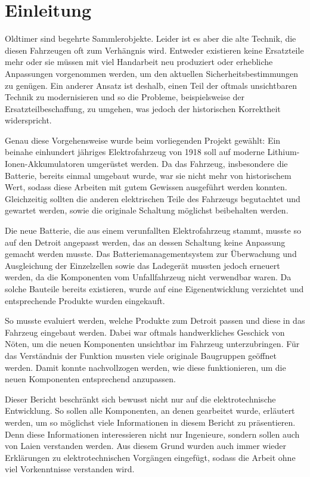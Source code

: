 \chapter{Einleitung}

Oldtimer sind begehrte Sammlerobjekte. Leider ist es aber die alte Technik, die diesen Fahrzeugen oft zum Verhängnis wird. Entweder existieren keine Ersatzteile mehr oder sie müssen mit viel Handarbeit neu produziert oder erhebliche Anpassungen vorgenommen werden, um den aktuellen Sicherheitsbestimmungen zu genügen. Ein anderer Ansatz ist deshalb, einen Teil der oftmals unsichtbaren Technik zu modernisieren und so die Probleme, beispielsweise der Ersatzteilbeschaffung, zu umgehen, was jedoch der historischen Korrektheit widerspricht.

Genau diese Vorgehensweise wurde beim vorliegenden Projekt gewählt: Ein beinahe einhundert jähriges Elektrofahrzeug von 1918 soll auf moderne Lithium-Ionen-Akkumulatoren umgerüstet werden. Da das Fahrzeug, insbesondere die Batterie, bereits einmal umgebaut wurde, war sie nicht mehr von historischem Wert, sodass diese Arbeiten mit gutem Gewissen ausgeführt werden konnten. Gleichzeitig sollten die anderen elektrischen Teile des Fahrzeugs begutachtet und gewartet werden, sowie die originale Schaltung möglichst beibehalten werden.

Die neue Batterie, die aus einem verunfallten Elektrofahrzeug stammt, musste so auf den Detroit angepasst werden, das an dessen Schaltung keine Anpassung gemacht werden musste. Das Batteriemanagementsystem zur Überwachung und Ausgleichung der Einzelzellen sowie das Ladegerät mussten jedoch erneuert werden, da die Komponenten vom Unfallfahrzeug nicht verwendbar waren. Da solche Bauteile bereits existieren, wurde auf eine Eigenentwicklung verzichtet und entsprechende Produkte wurden eingekauft.

So musste evaluiert werden, welche Produkte zum Detroit passen und diese in das Fahrzeug eingebaut werden. Dabei war oftmals handwerkliches Geschick von Nöten, um die neuen Komponenten unsichtbar im Fahrzeug unterzubringen. Für das Verständnis der Funktion mussten viele originale Baugruppen geöffnet werden. Damit konnte nachvollzogen werden, wie diese funktionieren, um die neuen Komponenten entsprechend anzupassen.

Dieser Bericht beschränkt sich bewusst nicht nur auf die elektrotechnische Entwicklung. So sollen alle Komponenten, an denen gearbeitet wurde, erläutert werden, um so möglichst viele Informationen in diesem Bericht zu präsentieren. Denn diese Informationen interessieren nicht nur Ingenieure, sondern sollen auch von Laien verstanden werden. Aus diesem Grund wurden auch immer wieder Erklärungen zu elektrotechnischen Vorgängen eingefügt, sodass die Arbeit ohne viel Vorkenntnisse verstanden wird. 